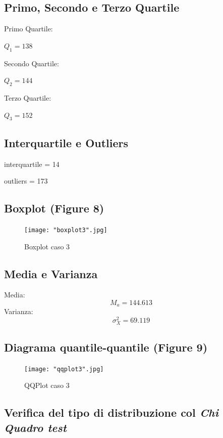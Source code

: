 \documentclass[a4paper]{article}
\begin{document}
\subsection{Primo, Secondo e Terzo Quartile}
Primo Quartile:
\begin{center}
	$Q_1= 138$
\end{center}
Secondo Quartile:
\begin{center}
	$Q_2= 144$
\end{center}
Terzo Quartile:
\begin{center}
	$Q_3= 152$
\end{center}


\subsection{Interquartile e Outliers}
\begin{center}
	interquartile = 14
\end{center}
\begin{center}
	outliers = 173
\end{center}

\subsection{Boxplot (Figure 8)}
\begin{figure}[htp]
	\centering
	\texttt{[image: "boxplot3".jpg]}
	\caption{Boxplot caso 3}
	\label{}
\end{figure}

\subsection{Media e Varianza}
Media: 
\begin{equation}
	M_{a} = 144.613
\end{equation}
Varianza: 
\begin{equation}
	\sigma _{X}^{2} = 69.119
\end{equation}

\subsection{Diagrama quantile-quantile (Figure 9)}
\begin{figure}[htp]
	\centering
	\texttt{[image: "qqplot3".jpg]}
	\caption{QQPlot caso 3}
	\label{}
\end{figure}

\subsection{Verifica del tipo di distribuzione col \emph{Chi Quadro test}}
\end{document}
